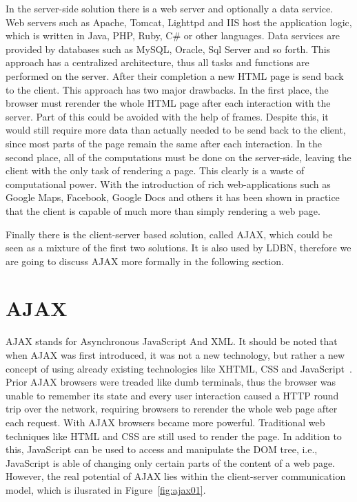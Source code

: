 In the server-side solution there is a web server and optionally a data service. 
Web servers such as Apache, Tomcat, Lighttpd and IIS host the application 
logic, which is written in Java, PHP, Ruby, C\# or other languages. 
Data services are provided by databases such as MySQL, Oracle, Sql Server and 
so forth. This approach has a centralized architecture, thus all tasks and 
functions are performed on the server. After their completion a new HTML page is 
send back to the client. This approach has two major drawbacks. In the first place, 
the browser must rerender the whole HTML page after each interaction with the server.
Part of this could be avoided with the help of frames. Despite this, it would still 
require more data than actually needed to be send back to the client, since most 
parts of the page remain the same after each interaction. In the second place, 
all of the computations must be done on the server-side, leaving the client with 
the only task of rendering a page. This clearly is a waste of computational power. 
With the introduction of rich web-applications such as Google Maps, Facebook, 
Google Docs and others it has been shown in practice that the client is capable of 
much more than simply rendering a web page. 

Finally there is the client-server based solution, called AJAX, which could be
seen as a mixture 
of the first two solutions. It is also used by LDBN, therefore we are going to
discuss AJAX more formally in the following section.

\section{AJAX}
\label{sec:ajax}
AJAX stands for Asynchronous JavaScript And XML. It should be noted
that when AJAX was first introduced, it was not a new technology, 
but rather a new concept of using already existing technologies like XHTML, 
CSS and JavaScript~\cite{w3}.  Prior AJAX browsers were treaded 
like dumb terminals, thus the browser was unable to remember its state and every 
user interaction caused a HTTP round trip over the network, requiring browsers 
to rerender the whole web page after each request. With AJAX browsers became 
more powerful. Traditional web techniques like HTML and CSS are still used to 
render the page. In addition to this, JavaScript can be used to access 
and manipulate the DOM tree, i.e., JavaScript is able of changing only certain parts
of the content of a web page. However, the
real potential of AJAX lies within the client-server communication model, which 
is ilusrated in Figure~\ref{fig:ajax01}.  

